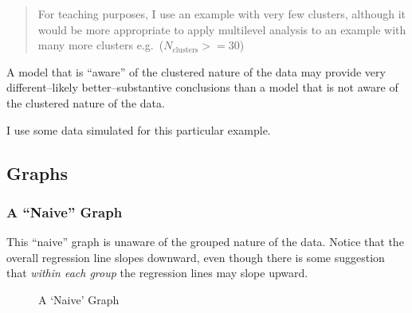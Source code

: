 \documentclass[
  letterpaper,
  DIV=11,
  numbers=noendperiod]{scrreprt}
\begin{document}
\begin{quote}
For teaching purposes, I use an example with very few clusters, although
it would be more appropriate to apply multilevel analysis to an example
with many more clusters e.g.~(\(N_\text{clusters} >= 30\))
\end{quote}

A model that is ``aware'' of the clustered nature of the data may
provide very different--likely better--substantive conclusions than a
model that is not aware of the clustered nature of the data.
 

I use some data simulated for this particular example.

\subsection{Graphs}\label{graphs}

\subsubsection{A ``Naive'' Graph}\label{a-naive-graph}

This ``naive'' graph is unaware of the grouped nature of the data.
Notice that the overall regression line slopes downward, even though
there is some suggestion that \emph{within each group} the regression
lines may slope upward.

\begin{figure}


\caption{\label{fig-naive}A `Naive' Graph}

\end{figure}%
\end{document}
